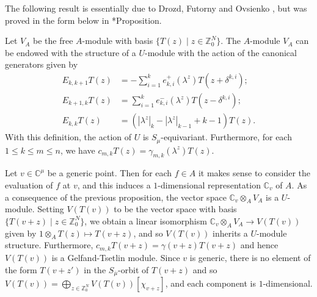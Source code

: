 \documentclass[11pt,fleqn]{article}
\newcommand\CC{\mathbb C}
\newcommand\ZZ{\mathbb Z}
\newcommand\ot{\otimes}
\renewcommand\to{\longrightarrow}
\begin{document}
The following result is essentially due 
to Drozd, Futorny and Ovsienko \cite{DFO-GT-modules}, but was proved in the 
form below in \cite{Zad-1-sing}*{Proposition}.
\begin{Proposition}
\label{P:universal-generic-GT-module}
Let $V_A$ be the free $A$-module with basis $\{T(z) \mid z \in \ZZ^N_0\}$.
The $A$-module $V_A$ can be endowed with the structure of a $U$-module 
with the action of the canonical generators given by
\begin{align*}
E_{k,k+1} T(z) 
  &= - \sum_{i=1}^k e^+_{k,i}(\lambda^z) T(z + \delta^{k,i}); \\
E_{k+1,k} T(z) 
  &= \sum_{i=1}^k e^-_{k,i}(\lambda^z) T(z - \delta^{k,i}); \\
E_{k,k} T(z)
  &= (|\lambda^z|_k - |\lambda^z|_{k-1} + k -1) T(z).
\end{align*}
With this definition, the action of $U$ is $S_\mu$-equivariant.
Furthermore, for each $1 \leq k \leq m \leq n$, we have $c_{m,k} T(z) = 
\gamma_{m,k}(\lambda^z) T(z)$.
\end{Proposition}
Let $v \in \CC^\mu$ be a generic point. Then for each $f \in A$ it makes sense 
to consider the evaluation of $f$ at $v$, and this induces a $1$-dimensional 
representation $\CC_v$ of $A$. As a consequence of the previous proposition, 
the vector space $\CC_v \ot_A V_A$ is a $U$-module. Setting $V(T(v))$ to be 
the vector space with basis $\{T(v+z) \mid z \in \ZZ^N_0\}$, we obtain a 
linear isomorphism $\CC_v \ot_A V_A \to V(T(v))$ given by $1 \ot_A T(z) 
\mapsto T(v+z)$, and so $V(T(v))$ inherits a $U$-module structure. 
Furthermore, $c_{m,k} T(v+z) =\gamma(v+z) T(v+z)$ and hence $V(T(v))$ is a 
Gelfand-Tsetlin module. Since $v$ is generic, there is no element of the form 
$T(v+z')$ in the $S_{\overline \mu}$-orbit of $T(v+z)$ and so $V(T(v)) = 
\bigoplus_{z \in \ZZ^N_0} V(T(v))[\chi_{v+z}]$, and each component is 
$1$-dimensional.
\end{document}
